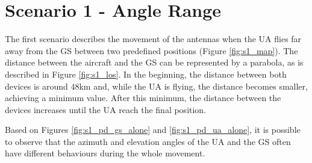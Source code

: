 \newpage
\section{Scenario 1 - Angle Range}\label{sec:scenario1}
The first scenario describes the movement of the antennas when the UA flies far away from the GS between two predefined positions (Figure \ref{fig:s1_map}). The distance between the aircraft and the GS can be represented by a parabola, as is described in Figure \ref{fig:s1_los}. In the beginning, the distance between both devices is around 48km and, while the UA is flying, the distance becomes smaller, achieving a minimum value. After this minimum, the distance between the devices increases until the UA reach the final position.

Based on Figures \ref{fig:s1_pd_gs_alone} and \ref{fig:s1_pd_ua_alone}, it is possible to observe that the azimuth and elevation angles of the UA and the GS often have different behaviours during the whole movement. 

